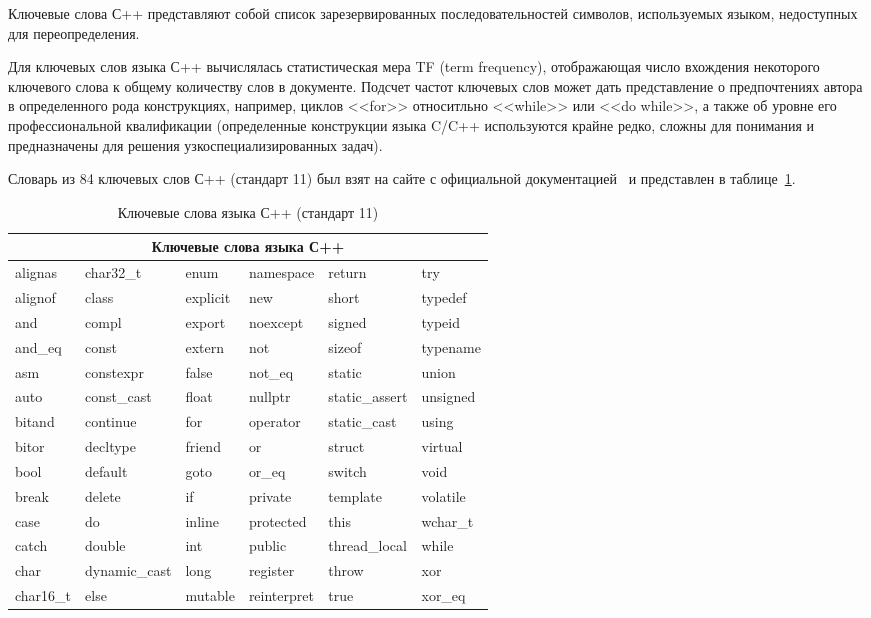 Ключевые слова С++ представляют собой список зарезервированных последовательностей символов, 
используемых языком, недоступных для переопределения.

Для ключевых слов языка С++ вычислялась статистическая мера TF (term frequency), 
отображающая число вхождения некоторого ключевого слова к общему количеству слов в документе.
Подсчет частот ключевых слов может дать представление о предпочтениях автора в определенного рода конструкциях,
например, циклов <<for>> относитльно <<while>> или <<do while>>, 
а также об уровне его профессиональной квалификации (определенные конструкции языка C/C++ используются крайне
редко, сложны для понимания и предназначены для решения узкоспециализированных задач).

Словарь из 84 ключевых слов С++ (стандарт 11) был взят на сайте с официальной документацией~\cite{cppkeywords} 
и представлен в таблице~\ref{tab:3}.

\begin{table}[ht]
\caption{ Ключевые слова языка С++ (стандарт 11) }
\label{tab:3}
\begin{center}
\begin{tabularx}{\linewidth}{|X|X|X|X|X|X|}
\hline
\multicolumn{6}{|c|}{Ключевые слова языка С++} \\
\hline
alignas & char32\_t & enum & namespace & return & try\\
alignof & class & explicit & new & short & typedef\\
and & compl & export & noexcept & signed & typeid\\
and\_eq & const & extern & not & sizeof & typename\\
asm & constexpr & false & not\_eq & static & union\\
auto & const\_cast & float & nullptr & static\_assert & unsigned\\
bitand & continue & for & operator & static\_cast & using\\
bitor & decltype & friend & or & struct & virtual\\
bool & default & goto & or\_eq & switch & void\\
break & delete & if & private & template & volatile\\
case & do & inline & protected & this & wchar\_t\\
catch & double & int & public & thread\_local & while\\
char & dynamic\_cast & long & register & throw & xor\\
char16\_t & else & mutable & reinterpret & true & xor\_eq\\
\hline
\end{tabularx}
\end{center}
\end{table}